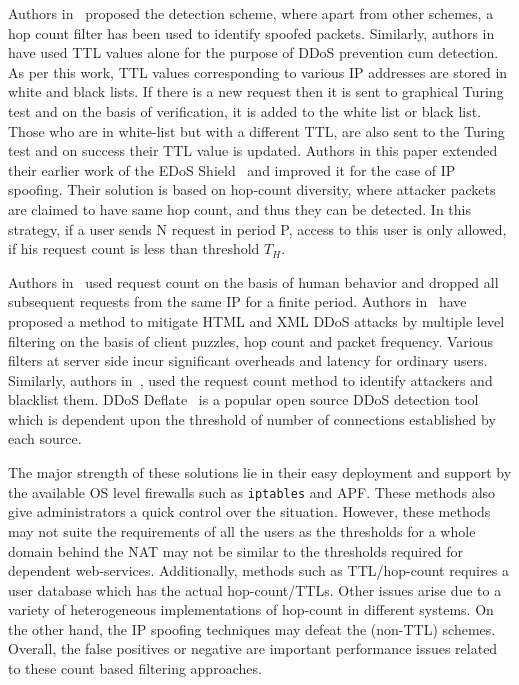 \documentclass[final,5p,times,twocolumn]{elsarticle}
\begin{document}
Authors in~\cite{comber} proposed the detection scheme, where apart from other schemes, a hop count filter has been used to identify spoofed packets. Similarly, authors in ~\cite{enhanced} have used TTL values alone for the purpose of DDoS prevention cum detection. As per this work, TTL values corresponding to various IP addresses are stored in white and black lists. If there is a new request then it is sent to graphical Turing test and on the basis of verification, it is added to the white list or black list. Those who are in white-list but with a different TTL, are also sent to the Turing test and on success their TTL value is updated. Authors in this paper extended their earlier work of the EDoS Shield~\cite{edosshield} and improved it for the case of IP spoofing. Their solution is based on hop-count diversity, where attacker packets are claimed to have same hop count, and thus they can be detected. In this strategy, if a user sends N request in period P, access to this user is only allowed, if his request count is less than threshold $T_{H}$. 

Authors in~\cite{index} used request count on the basis of human behavior and dropped all subsequent requests from the same IP for a finite period. Authors in~\cite{comber} have proposed a method to mitigate HTML and XML DDoS attacks by multiple level filtering on the basis of client puzzles, hop count and packet frequency. Various filters at server side incur significant overheads and latency for ordinary users. Similarly, authors in~\cite{army}, used the request count method to identify attackers and blacklist them. {DDoS Deflate~\cite{deflate} is a popular open source DDoS detection tool which is dependent upon the threshold of number of connections established by each source.} 

{The major strength of these solutions lie in their easy deployment and support by the available OS level firewalls such as \texttt{iptables} and APF. These methods also give administrators a quick control over the situation. }{However, these methods may not suite the requirements of all the users as the thresholds for a whole domain behind the NAT may not be similar to the thresholds required for dependent web-services. Additionally, methods such as TTL/hop-count requires a user database which has the actual hop-count/TTLs. Other issues arise due to a variety of heterogeneous implementations of hop-count in different systems. On the other hand, the IP spoofing techniques may defeat  the (non-TTL) schemes. Overall, the false positives or negative are important performance issues related to these count based filtering approaches.}
\end{document}
